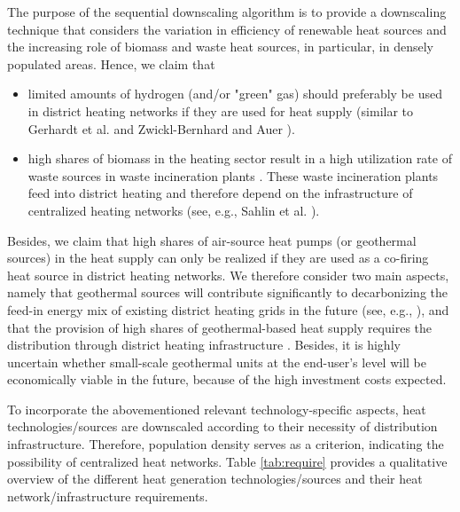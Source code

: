 The purpose of the sequential downscaling algorithm is to provide a downscaling technique that considers the variation in efficiency of renewable heat sources and the increasing role of biomass and waste heat sources, in particular, in densely populated areas. Hence, we claim that 

\begin{itemize}
	\item limited amounts of hydrogen (and/or "green" gas) should preferably be used in district heating networks if they are used for heat supply (similar to Gerhardt et al.  \cite{gerhardt2020hydrogen} and Zwickl-Bernhard and Auer \cite{zwickl2021demystifying}).
	\item high shares of biomass in the heating sector result in a high utilization rate of waste sources in waste incineration plants \cite{fruergaard2010energy}. These waste incineration plants feed into district heating and therefore depend on the infrastructure of centralized heating networks (see, e.g., Sahlin et al. \cite{sahlin2004effects}).
\end{itemize}

Besides, we claim that high shares of air-source heat pumps (or geothermal sources) in the heat supply can only be realized if they are used as a co-firing heat source in district heating networks. We therefore consider two main aspects, namely that geothermal sources will contribute significantly to decarbonizing the feed-in energy mix of existing district heating grids in the future (see, e.g., \cite{weinand2019developing}), and that the provision of high shares of geothermal-based heat supply requires the distribution through district heating infrastructure \cite{dalla2020scenarios}. Besides, it is highly uncertain whether small-scale geothermal units at the end-user's level will be economically viable in the future, because of the high investment costs expected.\vspace{0.3cm}

To incorporate the abovementioned relevant technology-specific aspects, heat technologies/sources are downscaled according to their necessity of distribution infrastructure. Therefore, population density serves as a criterion, indicating the possibility of centralized heat networks. Table \ref{tab:require} provides a qualitative overview of the different heat generation technologies/sources and their heat network/infrastructure requirements. 

